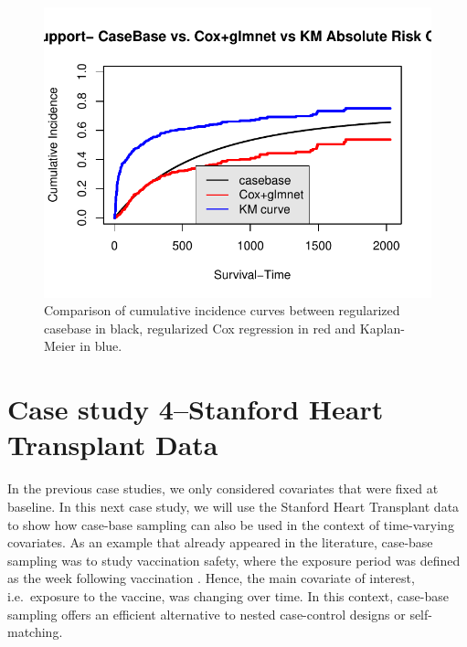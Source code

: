 \documentclass[
]{jss}
\begin{document}
\begin{CodeChunk}
\begin{figure}

{\centering \includegraphics{../figures/abSupportComparison-1} 

}

\caption{\label{fig:abSC} Comparison of cumulative incidence curves between regularized casebase in black, regularized Cox regression in red and Kaplan-Meier in blue.}\label{fig:abSupportComparison}
\end{figure}
\end{CodeChunk}

\hypertarget{case-study-4stanford-heart-transplant-data}{%
\section{Case study 4--Stanford Heart Transplant
Data}\label{case-study-4stanford-heart-transplant-data}}

In the previous case studies, we only considered covariates that were
fixed at baseline. In this next case study, we will use the Stanford
Heart Transplant data
\citep[\citet{crowley1977covariance}]{clark1971cardiac} to show how
case-base sampling can also be used in the context of time-varying
covariates. As an example that already appeared in the literature,
case-base sampling was to study vaccination safety, where the exposure
period was defined as the week following vaccination
\citep{saarela2015case}. Hence, the main covariate of interest,
i.e.~exposure to the vaccine, was changing over time. In this context,
case-base sampling offers an efficient alternative to nested
case-control designs or self-matching.
\end{document}
